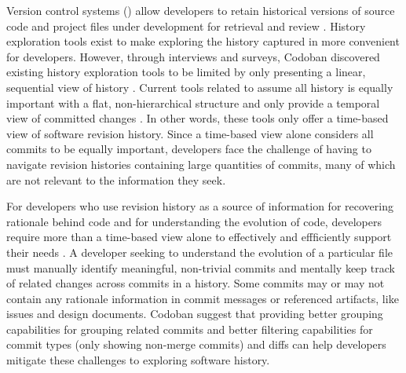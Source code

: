 Version control systems () allow developers to retain historical versions of source
code and project files under development for retrieval and review \cite{ruparelia_history-vcs_2010}.
History exploration tools exist to make exploring the history captured in  more
convenient for developers.
However, through interviews and surveys, Codoban \etal discovered existing history exploration tools 
to be limited by only presenting a linear, sequential view of history \cite{codoban_software_2015}.
Current tools related to  assume all history is equally important 
with a flat, non-hierarchical structure and only provide a temporal view of committed changes \cite{codoban_software_2015}.
In other words, these tools only offer a time-based view of software revision history.
Since a time-based view alone considers all commits to be equally important,
developers face the challenge of having to navigate revision histories containing 
large quantities of commits, many of which are not relevant to the information they seek.

For developers who use revision history as a source of information
for recovering rationale behind code and for understanding the evolution of code, 
developers require more than a time-based view alone to effectively 
and effficiently support their needs \cite{codoban_software_2015}.
A developer seeking to understand the evolution of a particular file must 
manually identify meaningful, non-trivial commits and mentally keep track of related
changes across commits in a history.
Some commits may or may not contain any rationale information in
commit messages or referenced artifacts, like issues and design documents.
Codoban \etal suggest that providing better grouping capabilities for
grouping related commits and better filtering capabilities for commit types (\eg only showing non-merge commits) and diffs
can help developers mitigate these challenges to exploring software history.


